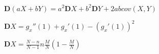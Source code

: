 \documentclass{article}
\begin{document}
    $\textbf{D}(aX + bY) = a^2\textbf{D}X + b^2\textbf{D}Y + 2abcov(X,Y)$

    \vspace{15pt}

    $\textbf{D}X = g_x''(1) + g_x'(1) - (g_x'(1))^2$

    \vspace{15pt}

    $\textbf{D}X = \frac{N-n}{N-1}n\frac{M}{N}(1-\frac{M}{N})$
\end{document}
